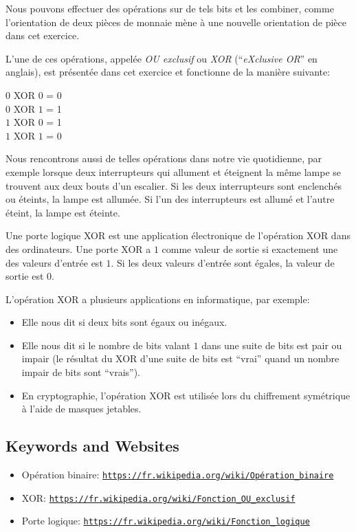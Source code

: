 \documentclass[a4paper,11pt]{report}
\makeatletter
\renewenvironment{adjustwidth}[2]{%
    \begin{list}{}{%
    \partopsep\z@%
    \topsep\z@%
    \listparindent\parindent%
    \parsep\parskip%
    \@ifmtarg{#1}{\setlength{\leftmargin}{\z@}}%
                 {\setlength{\leftmargin}{#1}}%
    \@ifmtarg{#2}{\setlength{\rightmargin}{\z@}}%
                 {\setlength{\rightmargin}{#2}}%
    }
    \item[]}{\end{list}}
\newcommand{\BrochureUrlText}[1]{\texttt{#1}}
\makeatother
\begin{document}
Nous pouvons effectuer des opérations sur de tels bits et les combiner, comme l’orientation de deux pièces de monnaie mène à une nouvelle orientation de pièce dans cet exercice.

L’une de ces opérations, appelée \emph{OU exclusif} ou \emph{XOR} (“\emph{eXclusive OR}” en anglais), est présentée dans cet exercice et fonctionne de la manière suivante:

\begin{adjustwidth}{1.5em}{0em}
$0$ XOR $0$ = 0 \\
$0$ XOR $1$ = 1 \\
$1$ XOR $0$ = 1 \\
$1$ XOR $1$ = 0
\end{adjustwidth}

Nous rencontrons aussi de telles opérations dans notre vie quotidienne, par exemple lorsque deux interrupteurs qui allument et éteignent la même lampe se trouvent aux deux bouts d’un escalier. Si les deux interrupteurs sont enclenchés ou éteints, la lampe est allumée. Si l’un des interrupteurs est allumé et l’autre éteint, la lampe est éteinte.

Une porte logique XOR est une application électronique de l’opération XOR dans des ordinateurs. Une porte XOR a $1$ comme valeur de sortie si exactement une des valeurs d’entrée est $1$. Si les deux valeurs d’entrée sont égales, la valeur de sortie est $0$.

L’opération XOR a plusieurs applications en informatique, par exemple:

\begin{itemize}
  \item Elle nous dit si deux bits sont égaux ou inégaux.
  \item Elle nous dit si le nombre de bits valant $1$ dans une suite de bits est pair ou impair (le résultat du XOR d’une suite de bits est “vrai” quand un nombre impair de bits sont “vrais”).
  \item En cryptographie, l’opération XOR est utilisée lors du chiffrement symétrique à l’aide de masques jetables.
\end{itemize}

{\raggedright

\subsection*{Keywords and Websites}

\begin{itemize}
  \item Opération binaire: \href{https://fr.wikipedia.org/wiki/Op\%C3\%A9ration_binaire}{\BrochureUrlText{https://fr.wikipedia.org/wiki/Opération\_binaire}}
  \item XOR: \href{https://fr.wikipedia.org/wiki/Fonction_OU_exclusif}{\BrochureUrlText{https://fr.wikipedia.org/wiki/Fonction\_OU\_exclusif}}
  \item Porte logique: \href{https://fr.wikipedia.org/wiki/Fonction_logique}{\BrochureUrlText{https://fr.wikipedia.org/wiki/Fonction\_logique}}
\end{itemize}


}
\end{document}

